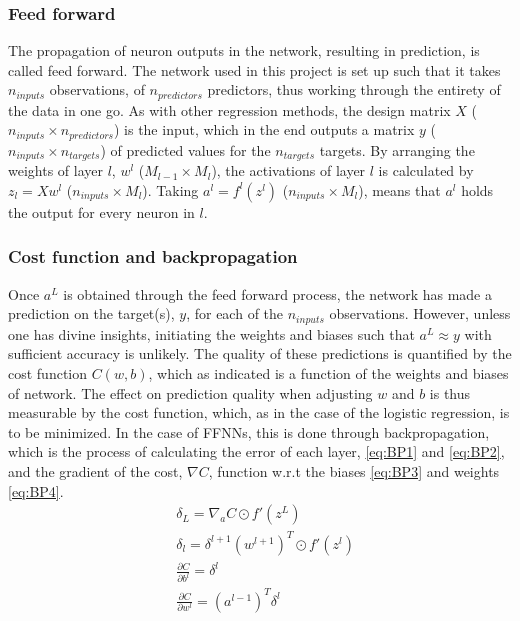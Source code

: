 \documentclass[%
oneside,                 %
final,                   %
10pt]{article}
\begin{document}
\subsubsection{Feed forward} \label{section_FF} 
The propagation of neuron outputs in the network, resulting in prediction, is called feed forward. The network used in this project is set up such that it takes  $n_{inputs}$ observations, of $n_{predictors}$ predictors, thus working through the entirety of the data in one go. As with other regression methods, the design matrix $X$ ($n_{inputs} \times n_{predictors}$) is the input, which in the end outputs a matrix $ y$ ($n_{inputs} \times n_{targets}$) of predicted values for the $n_{targets}$ targets. By arranging the weights of layer $l$, $w^l$ ($M_{l-1} \times M_l$), the activations of layer $l$ is calculated by $z_l=X w^l$ ($n_{inputs} \times M_l$). Taking $a^l=f^l(z^l)$ ($n_{inputs} \times M_l$), means that $a^l$ holds the output for every neuron in $l$. 

\subsubsection{Cost function and backpropagation} \label{Section_M_NN}
Once $a^L$ is obtained through the feed forward process, the network has made a prediction on the target(s), $y$, for each of the $n_{inputs}$ observations. However, unless one has divine insights, initiating the weights and biases such that $a^L \approx y$ with sufficient accuracy is unlikely. The quality of these  predictions is quantified by the cost function $C(w,b)$, which as indicated is a function of the weights and biases of network. The effect on prediction quality when adjusting $w$ and $b$ is thus measurable by the cost function, which, as in the case of the logistic regression, is to be minimized. In the case of FFNNs, this is done through backpropagation, which is the process of calculating the error of each layer, \eqref{eq:BP1} and \eqref{eq:BP2}, and the gradient of the cost, $\nabla C$, function w.r.t the biases \eqref{eq:BP3} and weights \eqref{eq:BP4}. 
\begin{align}
\label{eq:BP1} &\delta_L=\nabla_a C \odot  f' (z^L) \\  
\label{eq:BP2} &\delta_l=\delta^{l+1}(w^{l+1})^T \odot  f' (z^l)\\ 
 \label{eq:BP3} &\frac{\partial C}{\partial b^l} =\delta^l\\ 
\label{eq:BP4} &\frac{\partial C}{\partial w^l} =(a^{l-1})^T \delta^l 
\end{align}
\end{document}
